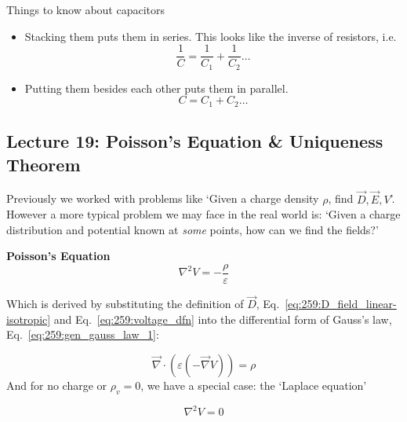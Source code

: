 \documentclass[10pt]{article}
\begin{document}
\begin{remark}
	Things to know about capacitors

	\begin{itemize}
		\item Stacking them puts them in series. This looks like the inverse of resistors, i.e.
			\begin{equation}
				\frac{1}{C} = \frac{1}{C_1} + \frac{1}{C_2} \ldots
			\end{equation}
		\item Putting them besides each other puts them in parallel. 
			\begin{equation}
				C = C_1 + C_2 \ldots
			\end{equation}
			
	\end{itemize}

\end{remark}


\subsection{Lecture 19: Poisson's Equation \& Uniqueness Theorem}

\begin{blockquote}
	Previously we worked with problems like `Given a charge density $ \rho $, find $ \vec{D}, \vec{E}, V $'. 
	However a more typical problem we may face in the real world is: `Given a charge distribution and potential known at \textit{some} points, how can we find the fields?'
\end{blockquote}




\begin{definition}
	\textbf{Poisson's Equation} 
	\begin{equation}
		\nabla^2 V = -\frac{\rho}{\varepsilon}
		\label{eq:259:poisson}
	\end{equation}

	Which is derived by substituting the definition of $ \vec{D} $, Eq.~\ref{eq:259:D_field_linear-isotropic} and Eq.~\ref{eq:259:voltage_dfn} into the differential form of Gauss's law, Eq.~\ref{eq:259:gen_gauss_law_1}:

	\begin{equation}
		\vec{\nabla} \cdot (\varepsilon (-\vec{\nabla}V)) = \rho
	\end{equation}
	And for no charge or $ \rho_v = 0 $, we have a special case: the `Laplace equation'

	\begin{equation}
		\nabla^2 V = 0
		\label{eq:259:poisson_laplace}
	\end{equation}
	
\end{definition}
\end{document}
